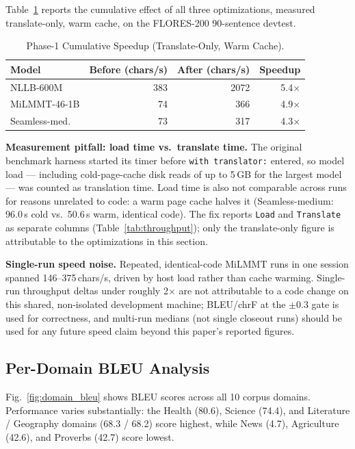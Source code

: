 \documentclass[conference]{IEEEtran}
\newcommand{\NLLBBEFORECHS}{383}
\newcommand{\NLLBAFTERCHS}{2072}
\newcommand{\NLLBSPEEDUP}{5.4$\times$}
\newcommand{\MILMMTBEFORECHS}{74}
\newcommand{\MILMMTAFTERCHS}{366}
\newcommand{\MILMMTSPEEDUP}{4.9$\times$}
\newcommand{\SEAMLESSBEFORECHS}{73}
\newcommand{\SEAMLESSAFTERCHS}{317}
\newcommand{\SEAMLESSSPEEDUP}{4.3$\times$}
\begin{document}
Table~\ref{tab:optpass} reports the cumulative effect of all three optimizations,
measured translate-only, warm cache, on the FLORES-200 90-sentence devtest.

\begin{table}[htbp]
\caption{Phase-1 Cumulative Speedup (Translate-Only, Warm Cache).}
\label{tab:optpass}
\centering
\begin{tabular}{lrrr}
\toprule
Model & Before (chars/s) & After (chars/s) & Speedup \\
\midrule
NLLB-600M     & \NLLBBEFORECHS{}    & \NLLBAFTERCHS{}    & \NLLBSPEEDUP{} \\
MiLMMT-46-1B  & \MILMMTBEFORECHS{}  & \MILMMTAFTERCHS{}  & \MILMMTSPEEDUP{} \\
Seamless-med. & \SEAMLESSBEFORECHS{}& \SEAMLESSAFTERCHS{}& \SEAMLESSSPEEDUP{} \\
\bottomrule
\end{tabular}
\end{table}

\textbf{Measurement pitfall: load time vs.\ translate time.} The original
benchmark harness started its timer before \texttt{with translator:} entered,
so model load --- including cold-page-cache disk reads of up to 5\,GB for the
largest model --- was counted as translation time. Load time is also not
comparable across runs for reasons unrelated to code: a warm page cache halves it
(Seamless-medium: 96.0\,s cold vs.\ 50.6\,s warm, identical code). The fix reports
\texttt{Load} and \texttt{Translate} as separate columns (Table~\ref{tab:throughput});
only the translate-only figure is attributable to the optimizations in this section.

\textbf{Single-run speed noise.} Repeated, identical-code MiLMMT runs in one
session spanned 146--375\,chars/s, driven by host load rather than cache warming.
Single-run throughput deltas under roughly 2$\times$ are not attributable to a code
change on this shared, non-isolated development machine; BLEU/chrF at the
$\pm$0.3 gate is used for correctness, and multi-run medians (not single closeout
runs) should be used for any future speed claim beyond this paper's reported figures.

\subsection{Per-Domain BLEU Analysis}

Fig.~\ref{fig:domain_bleu} shows BLEU scores across all 10 corpus domains.
Performance varies substantially: the Health (80.6), Science (74.4), and
Literature / Geography domains (68.3 / 68.2) score highest, while News (4.7),
Agriculture (42.6), and Proverbs (42.7) score lowest.
\end{document}
